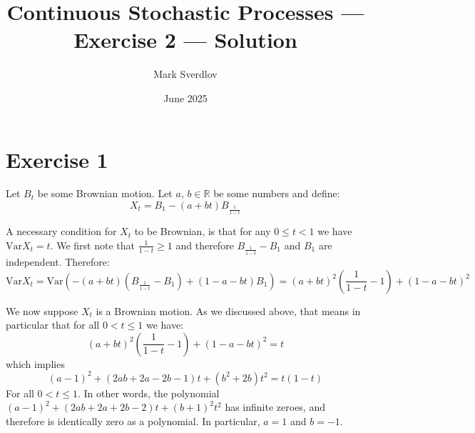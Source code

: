 \documentclass{amsart}
\title{Continuous Stochastic Processes --- Exercise 2 --- Solution}
\author{Mark Sverdlov}
\date{June 2025}
\theoremstyle{plain}
\theoremstyle{definition}
\theoremstyle{definition}
\theoremstyle{remark}
\begin{document}
    \maketitle
    \section{Exercise 1}
    Let \(B_{t}\) be some Brownian motion. Let \(a,\,b\in \mathbb{R}\) be some numbers and define:
    \begin{equation*}
        X_{t} = B_{1} - \left( a+bt \right)B_{\frac{1}{1-t}}
    \end{equation*}

A necessary condition for \(X_{t}\) to be Brownian, is that for any \(0\leq t < 1\) we have \(\mathrm{Var}X_{t} = t\). We first note that \(\frac{1}{1-t} \geq 1\) and therefore \(B_{\frac{1}{1-t}}-B_{1}\) and \(B_{1}\) are independent. Therefore:
\begin{equation*}
    \mathrm{Var}X_{t} = \mathrm{Var} \left(-\left(a+bt\right)\left(B_{\frac{1}{1-t}}-B_{1}\right)+\left(1-a-bt\right)B_{1}\right)=\left(a+bt\right)^{2}\left(\frac{1}{1-t}-1\right)+\left(1-a-bt\right)^{2}
\end{equation*}


We now suppose \(X_{t}\) is a Brownian motion. As we discussed above, that means in particular that for all \(0 < t \leq 1\) we have:
\begin{equation*}
    \left(a+bt\right)^{2}\left(\frac{1}{1-t}-1\right)+\left(1-a-bt\right)^{2} = t
\end{equation*}
which implies
\begin{equation*}
    \label{eq:2}
    \left(a-1\right)^{2}+\left(2ab+2a-2b-1\right)t+\left(b^{2}+2b\right)t^{2} = t \left(1-t\right)
\end{equation*}
For all \(0<t\leq 1\). In other words, the polynomial \(\left(a-1\right)^{2}+\left(2ab+2a+2b-2\right)t+\left(b+1\right)^{2}t^{2}\) has infinite zeroes, and therefore is identically zero as a polynomial. In particular, \(a=1\) and \(b=-1\).
\end{document}
